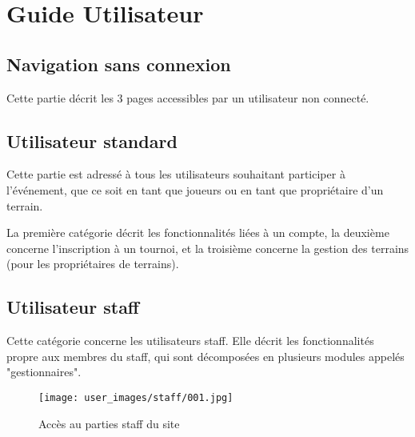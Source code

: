 \part{Guide Utilisateur}

\chapter{Navigation sans connexion}

Cette partie décrit les 3 pages accessibles par un utilisateur non connecté.







\chapter{Utilisateur standard}

Cette partie est adressé à tous les utilisateurs souhaitant participer à l'événement, que ce soit en tant que joueurs ou en tant que propriétaire d'un terrain. \newline

La première catégorie décrit les fonctionnalités liées à un compte, la deuxième concerne l'inscription à un tournoi, et la troisième concerne la gestion des terrains (pour les propriétaires de terrains).







\chapter{Utilisateur staff}

Cette catégorie concerne les utilisateurs staff. Elle décrit les fonctionnalités propre aux membres du staff, qui sont décomposées en plusieurs modules appelés "gestionnaires".

\begin{figure}[H]
\centering
\texttt{[image: user\_images/staff/001.jpg]}
\caption{Accès au parties staff du site}
\end{figure}













